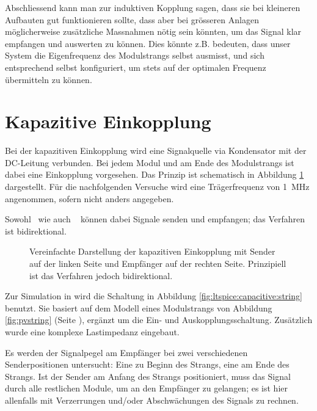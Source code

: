 Abschliessend kann man  zur induktiven Kopplung sagen, dass  sie bei kleineren
Aufbauten  gut  funktionieren  sollte,   dass  aber  bei  gr\"osseren  Anlagen
m\"oglicherweise  zus\"atzliche  Massnahmen  n\"otig sein  k\"onnten,  um  das
Signal klar empfangen und auswerten  zu k\"onnen. Dies k\"onnte z.B. bedeuten,
dass  unser System  die Eigenfrequenz  des Modulstrangs  selbst ausmisst,  und
sich entsprechend  selbst konfiguriert,  um stets  auf der  optimalen Frequenz
\"ubermitteln zu k\"onnen.


\clearpage
\section{Kapazitive Einkopplung}
\label{sec:simu:coupling:capacitive}

Bei der  kapazitiven Einkopplung  wird eine  Signalquelle via  Kondensator mit
der  DC-Leitung  verbunden. Bei  jedem  Modul und  am  Ende  des  Modulstrangs
ist   dabei  eine   Einkopplung   vorgesehen. Das   Prinzip  ist   schematisch
in   Abbildung   \ref{fig:circ:coupling:capacitive}   dargestellt. F\"ur   die
nachfolgenden  Versuche  wird  eine Tr\"agerfrequenz  von  \SI{1}{\mega\hertz}
angenommen, sofern nicht anders angegeben.

Sowohl \Master ~wie auch \Sensor~ k\"onnen dabei Signale senden und empfangen;
das Verfahren ist bidirektional.

\begin{figure}[h!tb]
    \centering
    
    \caption[Ersatzschaltbild kapazitive Einkopplung]{%
        Vereinfachte Darstellung  der kapazitiven  Einkopplung mit  Sender auf
        der linken  Seite und  Empf\"anger auf der  rechten Seite. Prinzipiell
        ist das Verfahren jedoch bidirektional.%
    }
    \label{fig:circ:coupling:capacitive}
\end{figure}

Zur   Simulation   in     wird   die   Schaltung  in   Abbildung
\ref{fig:ltspice:capacitive:string} benutzt. Sie basiert  auf dem Modell eines
Modulstrangs von Abbildung  \ref{fig:pvstring} (Seite \pageref{fig:pvstring}),
erg\"anzt  um  die  Ein-  und  Auskopplungsschaltung. Zus\"atzlich  wurde  eine
komplexe Lastimpedanz eingebaut.

Es werden der Signalpegel am Empf\"anger bei zwei verschiedenen Senderpositionen
untersucht: Eine zu Beginn des Strangs, eine am Ende des Strangs. Ist der Sender
am Anfang des Strangs positioniert, muss das Signal durch alle restlichen Module,
um an den Empf\"anger zu gelangen; es ist hier allenfalls mit Verzerrungen und/oder
Abschw\"achungen des Signals zu rechnen.


